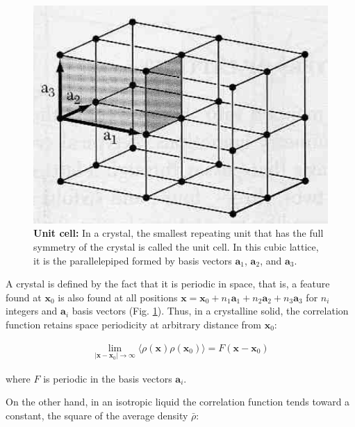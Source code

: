 \documentclass[twocolumn,aps,prl]{revtex4-1} %
\begin{document}
\begin{figure}
    \includegraphics[width=\columnwidth]{unit_cell.png}
    \caption{\textbf{Unit cell:} \cite{kittel_introduction_2005} In a crystal, the smallest repeating unit that has the full symmetry of the crystal is called the unit cell.  In this cubic lattice, it is the parallelepiped formed by basis vectors $\mathbf{a}_1$, $\mathbf{a}_2$, and $\mathbf{a}_3$. }
    \label{fig:unit_cell}
\end{figure}

A crystal is defined by the fact that it is periodic in space, that is, a feature found at $\mathbf{x}_0$ is also found at all positions $\mathbf{x} = \mathbf{x}_0 + n_1 \mathbf{a}_1 + n_2 \mathbf{a}_2 + n_3 \mathbf{a}_3$ for $n_i$ integers and $\mathbf{a}_i$ basis vectors  (Fig. \ref{fig:unit_cell}).  Thus, in a crystalline solid, the correlation function retains space periodicity at arbitrary distance from $\mathbf{x}_0$:

\begin{equation*}
\begin{split}
    \lim_{|\mathbf{x}-\mathbf{x}_0|\to \infty} \langle\rho(\mathbf{x})\rho(\mathbf{x}_0)\rangle = F(\mathbf{x} - \mathbf{x}_0)
\end{split}
\end{equation*}

\noindent where $F$ is periodic in the basis vectors $\mathbf{a}_i$.

On the other hand, in an isotropic liquid the correlation function tends toward a constant, the square of the average density $\bar{\rho}$:
\end{document}
